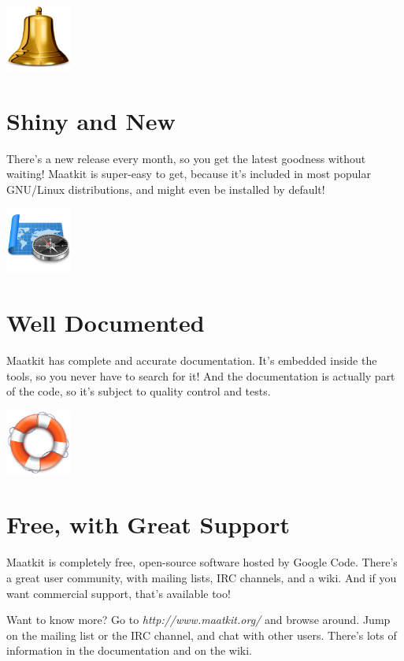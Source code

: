 \documentclass[letterpaper,twoside,12pt]{article}
\begin{document}
\begin{minipage}{0.2\textwidth}
\includegraphics[width=0.853in]{../image/bell}
\end{minipage}
\begin{minipage}{0.8\textwidth}
\section*{Shiny and New}
There's a new release every month, so you get the latest goodness without
waiting!  Maatkit is super-easy to get, because it's included in most popular
GNU/Linux distributions, and might even be installed by default!
\end{minipage}
\vspace*{1cm}

\begin{minipage}{0.2\textwidth}
\includegraphics[width=0.853in]{../image/documentation}
\end{minipage}
\begin{minipage}{0.8\textwidth}
\section*{Well Documented}
Maatkit has complete and accurate documentation. It's embedded inside the
tools, so you never have to search for it! And the documentation is
actually part of the code, so it's subject to quality control and
tests.
\end{minipage}
\vspace*{1cm}

\begin{minipage}{0.2\textwidth}
\includegraphics[width=0.853in]{../image/support}
\end{minipage}
\begin{minipage}{0.8\textwidth}
\section*{Free, with Great Support}
Maatkit is completely free, open-source software hosted by Google Code.
There's a great user community, with mailing lists, IRC channels, and a wiki.
And if you want commercial support, that's available too!
\end{minipage}
\vspace*{1cm}

Want to know more?  Go to \emph{http://www.maatkit.org/} and browse around.
Jump on the mailing list or the IRC channel, and chat with other users.
There's lots of information in the documentation and on the wiki.
\end{document}
